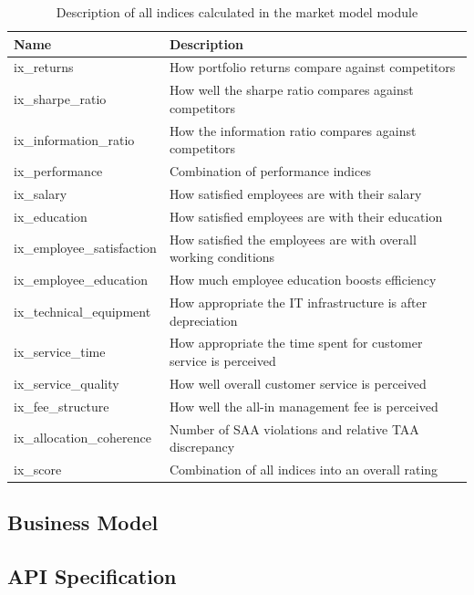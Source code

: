 \begin{table}[h!]
  \begin{tabular}{lp{11cm}}
    \toprule
    Name & Description \\
    \midrule
    ix\_returns & How portfolio returns compare against competitors \\
    \midrule
    ix\_sharpe\_ratio & How well the sharpe ratio compares against competitors \\
    ix\_information\_ratio & How the information ratio compares against competitors \\
    ix\_performance & Combination of performance indices \\
    \midrule
    ix\_salary & How satisfied employees are with their salary \\
    ix\_education & How satisfied employees are with their education \\
    ix\_employee\_satisfaction & How satisfied the employees are with overall working conditions \\
    \midrule
    ix\_employee\_education & How much employee education boosts efficiency \\
    ix\_technical\_equipment & How appropriate the IT infrastructure is after depreciation  \\
      ix\_service\_time & How appropriate the time spent for customer service is perceived \\
    ix\_service\_quality & How well overall customer service is perceived \\
    \midrule
    ix\_fee\_structure & How well the all-in management fee is perceived \\
    \midrule
    ix\_allocation\_coherence & Number of SAA violations and relative TAA discrepancy \\
    \midrule
    ix\_score & Combination of all indices into an overall rating \\
    \bottomrule
  \end{tabular}
  \centering
  \caption{Description of all indices calculated in the market model module}
  \label{table:market_model_indices}
\end{table}




\subsection{Business Model}



\subsection{API Specification}

